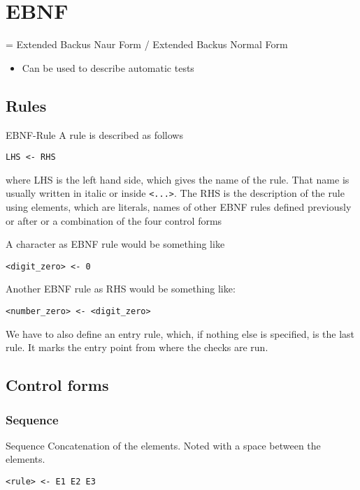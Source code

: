 \section{EBNF}\label{ebnf}
= Extended Backus Naur Form / Extended Backus Normal Form

\begin{itemize}
    \item Can be used to describe automatic tests
\end{itemize}

\subsection{Rules}
\begin{definition}[]{EBNF-Rule}
    A rule is described as follows

    \begin{verbatim}
LHS <- RHS
    \end{verbatim}

    where LHS is the left hand side, which gives the name of the rule. That name is usually written in italic or inside \texttt{\textless{}...\textgreater{}}. The RHS is the description of the rule using elements, which are literals, names of other EBNF rules defined previously or after or a combination of the four control forms
\end{definition}

A character as EBNF rule would be something like

\begin{verbatim}
<digit_zero> <- 0
\end{verbatim}

Another EBNF rule as RHS would be something like:

\begin{verbatim}
<number_zero> <- <digit_zero>
\end{verbatim}

We have to also define an entry rule, which, if nothing else is specified, is the last rule. It marks the entry point from where the checks are run.

\subsection{Control forms}

\subsubsection{Sequence}
\begin{definition}[]{Sequence}
    Concatenation of the elements. Noted with a space between the elements.

    \begin{verbatim}
<rule> <- E1 E2 E3
    \end{verbatim}
\end{definition}

